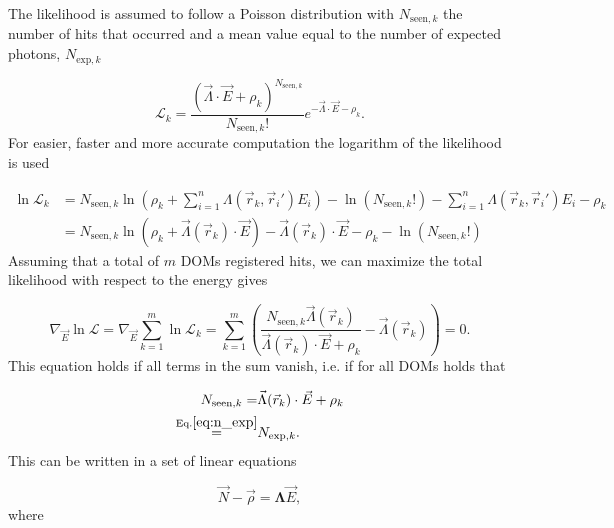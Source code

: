 The likelihood is assumed to follow a Poisson distribution with $N_{\textrm{seen},k}$ the number of hits that occurred and a mean value equal to the number of expected photons, $N_{\textrm{exp},k}$

\begin{equation}
\mathcal{L}_k = \frac{\left(\vec{\Lambda} \cdot \vec{E} + \rho_k \right)^{N_{\textrm{seen},k}}}{N_{\textrm{seen},k}!} e^{-\vec{\Lambda} \cdot \vec{E} - \rho_k}.
\end{equation}
\noindent For easier, faster and more accurate computation the logarithm of the likelihood is used

\begin{equation}
\begin{split}
\ln \mathcal{L}_k &= N_{\textrm{seen},k} \ln \left(\rho_k + \sum^n_{i=1} \Lambda(\vec{r}_k,\vec{r}_i') E_i \right) - \ln \left(N_{\textrm{seen},k}!\right) - \sum^n_{i=1} \Lambda(\vec{r}_k,\vec{r}_i') E_i - \rho_k\\
&= N_{\textrm{seen},k} \ln \left(\rho_k + \vec{\Lambda}(\vec{r}_k) \cdot \vec{E} \right) - \vec{\Lambda}(\vec{r}_k) \cdot \vec{E} - \rho_k - \ln\left(N_{\textrm{seen},k}!\right)
\end{split}
\end{equation}
\noindent Assuming that a total of $m$ DOMs registered hits, we can maximize the total likelihood with respect to the energy gives 

\begin{equation}
\nabla_{\vec{E}} \ln \mathcal{L} = \nabla_{\vec{E}} \sum^m_{k=1} \ln \mathcal{L}_k = \sum^m_{k=1} \left(\frac{N_{\textrm{seen},k} \vec{\Lambda}(\vec{r}_k)}{\vec{\Lambda}(\vec{r}_k) \cdot \vec{E} + \rho_k} - \vec{\Lambda}(\vec{r}_k) \right) = 0.
\end{equation}
\noindent This equation holds if all terms in the sum vanish, i.e. if for all DOMs holds that

\begin{equation}
\begin{split}
N_{\textrm{seen},k} = &\vec{\Lambda}(\vec{r}_k) \cdot \vec{E} + \rho_k\\
\overset{\textrm{Eq.}\ref{eq:n_exp}}{=} &N_{\textrm{exp},k}
.
\end{split}
\end{equation}
\noindent This can be written in a set of linear equations

\begin{equation}
\vec{N} - \vec{\rho} = \mathbf{\Lambda} \vec{E}, 
\end{equation}
\noindent where

